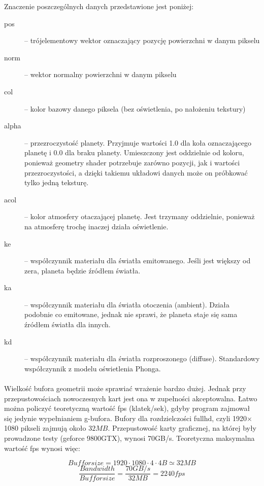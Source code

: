 Znaczenie poszczególnych danych przedstawione jest poniżej:

\begin{description}
\item[pos] -- trójelementowy wektor oznaczający pozycję powierzchni w danym pikselu
\item[norm] -- wektor normalny powierzchni w danym pikselu
\item[col] -- kolor bazowy danego piksela (bez oświetlenia, po nałożeniu tekstury)
\item[alpha] -- przezroczystość planety. Przyjmuje wartości 1.0 dla koła oznaczającego planetę i 0.0 dla braku planety. Umieszczony jest oddzielnie od koloru, ponieważ geometry shader potrzebuje zarówno pozycji, jak i wartości przezroczystości, a dzięki takiemu układowi danych może on próbkować tylko jedną teksturę.
\item[acol] -- kolor atmosfery otaczającej planetę. Jest trzymany oddzielnie, ponieważ na atmosferę trochę inaczej działa oświetlenie.
\item[ke] -- współczynnik materiału dla światła emitowanego. Jeśli jest większy od zera, planeta będzie źródłem światła.
\item[ka] -- współczynnik materiału dla światła otoczenia (ambient). Działa podobnie co emitowane, jednak nie sprawi, że planeta staje się sama źródłem światła dla innych.
\item[kd] -- współczynnik materiału dla światła rozproszonego (diffuse). Standardowy współczynnik z modelu oświetlenia Phonga.
\end{description}

\paragraph{}

Wielkość bufora geometrii może sprawiać wrażenie bardzo dużej. Jednak przy przepustowościach nowoczesnych kart jest ona w zupełności akceptowalna. Łatwo można policzyć teoretyczną wartość fps (klatek/sek), gdyby program zajmował się jedynie wypełnianiem g-bufora. Bufory dla rozdzielczości fullhd, czyli 1920$\times$1080 pikseli zajmują około $32MB$. Przepustowość karty graficznej, na której były prowadzone testy (geforce 9800GTX), wynosi 70GB/s. Teoretyczna maksymalna wartość fps wynosi więc:

$$ Buffor size = 1920 \cdot 1080 \cdot 4 \cdot 4B \simeq 32MB $$
$$ \frac{Bandwidth}{Buffor size} = \frac{70GB/s}{32MB} = 2240 fps $$

